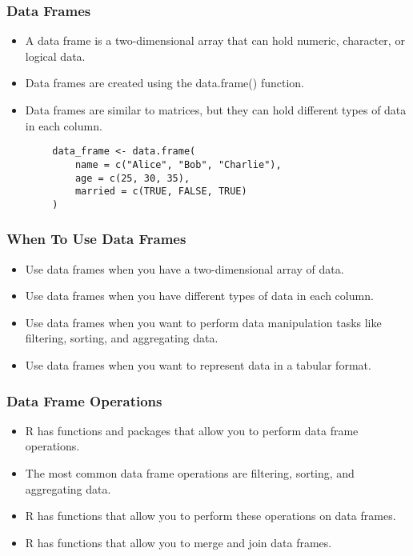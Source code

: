 \documentclass[serif, 9pt, aspectratio=32]{beamer}
\begin{document}
\begin{frame}
    \centering
    \frametitle{Data Frames}
    \begin{itemize}
        \setlength{\itemsep}{2em}
        \item A data frame is a two-dimensional array that can hold numeric, character, or logical data.
        \item Data frames are created using the data.frame() function.
        \item Data frames are similar to matrices, but they can hold different types of data in each column.
    \end{itemize}
\end{frame}

\begin{frame}[fragile]
    \begin{lstlisting}
        data_frame <- data.frame(
            name = c("Alice", "Bob", "Charlie"),
            age = c(25, 30, 35),
            married = c(TRUE, FALSE, TRUE)
        )
    \end{lstlisting}
\end{frame}

\begin{frame}
    \centering
    \frametitle{When To Use Data Frames}
    \begin{itemize}
        \setlength{\itemsep}{2em}
        \item Use data frames when you have a two-dimensional array of data.
        \item Use data frames when you have different types of data in each column.
        \item Use data frames when you want to perform data manipulation tasks like filtering, sorting, and aggregating data.
        \item Use data frames when you want to represent data in a tabular format.
    \end{itemize}
\end{frame}

\begin{frame}
    \centering
    \frametitle{Data Frame Operations}
    \begin{itemize}
        \setlength{\itemsep}{2em}
        \item R has functions and packages that allow you to perform data frame operations.
        \item The most common data frame operations are filtering, sorting, and aggregating data.
        \item R has functions that allow you to perform these operations on data frames.
        \item R has functions that allow you to merge and join data frames.
    \end{itemize}
\end{frame}
\end{document}
